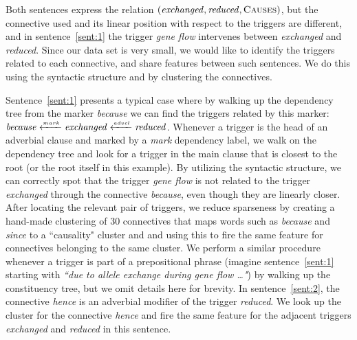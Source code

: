 Both sentences express the relation $(\mbox{\emph{exchanged}},\mbox{\emph{reduced}},\mbox{\textsc{Causes}})$, but the connective used and its linear position with respect to the triggers are different, and in sentence~\ref{sent:1} the trigger \emph{gene flow} intervenes between \emph{exchanged} and \emph{reduced}. Since our data set is very small, we would like to identify the triggers related to each connective, and share features between such sentences. We do this using the syntactic structure and by clustering the connectives.

Sentence~\ref{sent:1} presents a typical case where by walking up the dependency tree from the marker \emph{because} we can find the triggers related by this marker: $\mbox{\emph{because}}\xleftarrow{\scriptscriptstyle mark}\mbox{\emph{exchanged}}\xleftarrow{\scriptscriptstyle advcl}\mbox{\emph{reduced}}$. Whenever a trigger is the head of an adverbial clause and marked by a \emph{mark} dependency label, we walk on the dependency tree and look for a trigger in the main clause that is closest to the root (or the root itself in this example). 
By utilizing the syntactic structure, we can correctly spot that the trigger \emph{gene flow} is not related to the trigger \emph{exchanged} through the connective \emph{because}, even though they are linearly closer. After locating the relevant pair of triggers, we reduce sparseness by creating a hand-made clustering of 30 connectives that maps words such as \emph{because} and \emph{since} to a ``causality" cluster and and using this to fire the same feature for connectives belonging to the same cluster. We perform a similar procedure whenever a trigger is part of a prepositional phrase (imagine sentence~\ref{sent:1} starting with \emph{``due to allele exchange during gene flow \ldots"}) by walking up the constituency tree, but we omit details here for brevity. In sentence~\ref{sent:2}, the connective \emph{hence} is an adverbial modifier of the trigger \emph{reduced}. We look up the cluster for the connective \emph{hence} and fire the same feature for the adjacent triggers \emph{exchanged} and \emph{reduced} in this sentence.

